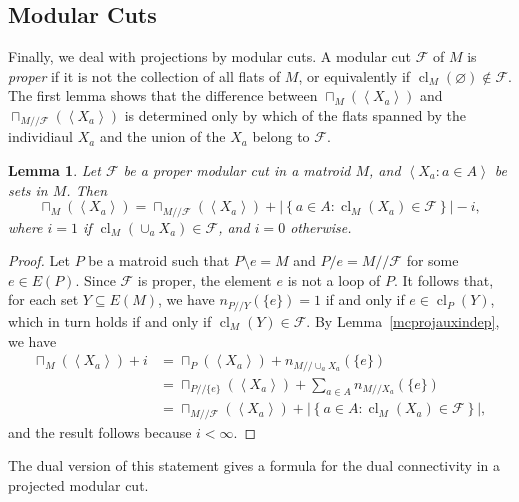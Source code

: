 \documentclass{amsart}
\theoremstyle{plain}
\newtheorem{lemma}[theorem]{Lemma}
\theoremstyle{definition}
\newcommand{\cF}{\mathcal{F}}
\newcommand{\dcon}{/ \!\! /}
\DeclareMathOperator{\cl}{cl}
\newcommand{\del}{\!\setminus\!}
\newcommand{\con}{/}
\newcommand{\abs}[1]{\left| #1 \right|}
\newcommand{\set}[1]{\left\{#1\right\}}
\newcommand{\ab}[1]{\left\langle#1\right\rangle}
\newcommand{\es}{\varnothing}
\renewcommand{\ss}{\subseteq}
\newcommand{\setof}[2]{\set{{#1} : {#2}}}
\begin{document}
\subsection*{Modular Cuts}

Finally, we deal with projections by modular cuts. 
A modular cut $\cF$ of $M$ is \emph{proper} if it is not the collection of
all flats of $M$, or equivalently if $\cl_M(\es) \notin \cF$.  
The first lemma shows that the difference between $\sqcap_M(\ab{X_a})$ and $\sqcap_{M \dcon \cF}(\ab{X_a})$ 
is determined only by which of the flats spanned by the individiaul $X_a$ and the union of the $X_a$ belong to $\cF$. 

\begin{lemma}\label{modcutcon}
  Let $\cF$ be a proper modular cut in a matroid $M$, and $\ab{X_a : a \in A}$ be sets in $M$. 
  Then 
  \[\sqcap_M(\ab{X_a}) = \sqcap_{M \dcon \cF}(\ab{X_a}) + \abs{\setof{a \in A}{\cl_M(X_a) \in \cF}} - i,\] 
  where $i = 1$ if $\cl_M(\cup_a X_a) \in \cF$, and $i = 0$ otherwise. 
\end{lemma}
\begin{proof}
  Let $P$ be a matroid such that $P \del e = M$ and $P \con e = M \dcon \cF$ 
  for some $e \in E(P)$. Since $\cF$ is proper, the element $e$ is not a loop of $P$. 
  It follows that, for each set $Y \ss E(M)$, we have $n_{P \dcon Y}(\{e\}) = 1$ 
  if and only if $e \in \cl_P(Y)$, which in turn holds if and only if $\cl_M(Y) \in \cF$. 
  By Lemma~\ref{mcprojauxindep}, we have 
  \begin{align*}
    \sqcap_M(\ab{X_a}) + i &= \sqcap_P(\ab{X_a}) + n_{M \dcon \cup_a X_a}(\{e\}) \\ 
    &= \sqcap_{P \dcon \{e\}}(\ab{X_a}) + \sum_{a \in A}n_{M \dcon X_a}(\{e\}) \\ 
    &= \sqcap_{M \dcon \cF}(\ab{X_a}) + \abs{\setof{a \in A}{\cl_M(X_a) \in \cF}},
  \end{align*}
  and the result follows because $i < \infty$. 
\end{proof}

The dual version of this statement gives a formula for the dual connectivity in a projected modular cut. 
\end{document}
